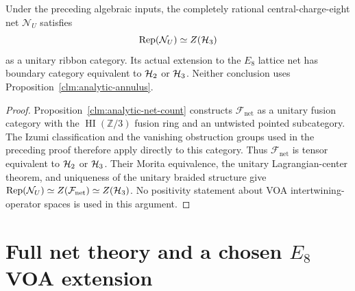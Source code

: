 \begin{corollary}
\label{cor:analytic-net-haagerup}
Under the preceding algebraic inputs, the completely rational
central-charge-eight net $\mathcal N_U$ satisfies
\[
 \operatorname{Rep}(\mathcal N_U)\simeq Z(\mathcal H_3)
\]
as a unitary ribbon category.  Its actual extension to the $E_8$
lattice net has boundary category equivalent to $\mathcal H_2$ or $\mathcal H_3$.
Neither conclusion uses Proposition~\ref{clm:analytic-annulus}.
\end{corollary}
\begin{proof}
Proposition~\ref{clm:analytic-net-count} constructs
$\mathcal F_{\mathrm{net}}$ as a unitary fusion category with the
$\operatorname{HI}(\mathbb Z/3)$ fusion ring and an untwisted pointed
subcategory.  The Izumi classification and the vanishing obstruction
groups used in the preceding proof therefore apply directly to this
category.  Thus $\mathcal F_{\mathrm{net}}$ is tensor equivalent to
$\mathcal H_2$ or $\mathcal H_3$.  Their Morita equivalence, the unitary
Lagrangian-center theorem, and uniqueness of the unitary braided
structure give
$\operatorname{Rep}(\mathcal N_U)\simeq Z(\mathcal F_{\mathrm{net}})\simeq Z(\mathcal H_3)$.
No positivity statement about VOA intertwining-operator spaces is
used in this argument.
\end{proof}

\section{Full net theory and a chosen \texorpdfstring{$E_8$}{E8} VOA extension}
\label{sec:analytic-full-theory}

